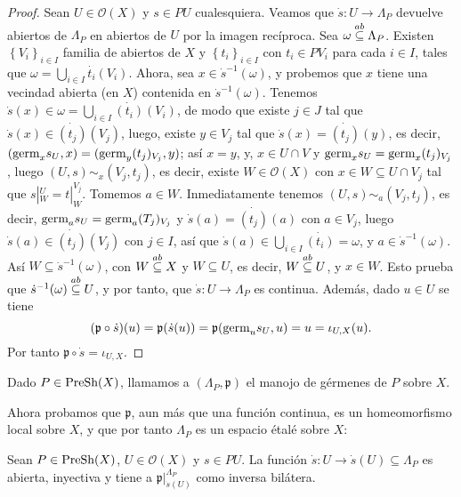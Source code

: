 \begin{proof}
   Sean $U\in\mathcal{O}(X)$ y $s\in PU$ cualesquiera. Veamos que $\dot{s}:U\to\Lambda_P$ devuelve abiertos de $\Lambda_P$ en abiertos de $U$ por la imagen recíproca. Sea $\omega\stackrel{ab}{\subseteq} \Lambda_P$. Existen $\left\lbrace V_i\right\rbrace_{i\in I}$ familia de abiertos de $X$ y $\left\lbrace t_i\right\rbrace_{i\in I}$ con $t_i\in PV_i$ para cada $i\in I$, tales que $\omega=\bigcup_{i\in I}\dot{t_i}(V_i)$. Ahora, sea $x\in\dot{s}^{-1}(\omega)$, y probemos que $x$ tiene una vecindad abierta (en $X$) contenida en $\dot{s}^{-1}(\omega)$. Tenemos $\dot{s}(x)\in\omega=\bigcup_{i\in I}\dot{(t_i)}(V_i)$, de modo que existe $j\in J$ tal que $\dot{s}(x)\in\dot{(t_{j})}(V_j)$, luego, existe $y\in V_j$ tal que $\dot{s}(x)=\dot{(t_j)}(y)$, es decir, $(\normalfont{\text{germ}}_{x}s_U,x)=(\normalfont{\text{germ}}_{y}(t_j)_{V_j},y)$; así $x=y$, y, $x\in U\cap V$ y $\normalfont{\text{germ}}_{x}s_{U}=\normalfont{\text{germ}}_{x}(t_j)_{V_j}$, luego $(U,s)\sim_{x}(V_j,t_j)$, es decir, existe $W\in\mathcal{O}(X)$ con $x\in W\subseteq U\cap V_j$ tal que $s|^{U}_{W}=t|^{V_j}_{W}$. Tomemos $a\in W$. Inmediatamente tenemos $(U,s)\sim_{a}(V_j,t_j)$, es decir, $\normalfont{\text{germ}}_{a}s_{U}=\normalfont{\text{germ}}_{a}(T_j)_{V_j}$ y $\dot{s}(a)=\dot{(t_j)}(a)$ con $a\in V_j$, luego $\dot{s}(a)\in\dot{(t_j)}(V_j)$ con $j\in I$, así que $\dot{s}(a)\in\bigcup_{i\in I}\dot{(t_i)}=\omega$, y $a\in\dot{s}^{-1}(\omega)$. Así $W\subseteq\dot{s}^{-1}(\omega)$, con $W\stackrel{ab}{\subseteq} X$ y $W\subseteq U$, es decir, $W\stackrel{ab}{\subseteq} U$, y $x\in W$. Esto prueba que $\dot{s}^{-1}(\omega)\stackrel{ab}{\subseteq} U$, y por tanto, que $\dot{s}:U\to\Lambda_P$ es continua. Además, dado $u\in U$ se tiene
   $$
      (\mathfrak{p}\circ\dot{s})(u)=\mathfrak{p}(\dot{s}(u))=\mathfrak{p}(\normalfont{\text{germ}}_{u}s_{U},u)=u=\iota_{U,X}(u).
   $$
   Por tanto $\mathfrak{p}\circ \dot{s}=\iota_{U,X}$.
\end{proof}
\begin{Def}
   Dado $P\in \normalfont{\text{PreSh}}(X)$, llamamos a $(\Lambda_P,\mathfrak{p})$ el manojo de gérmenes de $P$ sobre $X$.
\end{Def}
Ahora probamos que $\mathfrak{p}$, aun más que una función continua, es un homeomorfismo local sobre $X$, y que por tanto $\Lambda_P$ es un espacio étalé sobre $X$:
\begin{Lema}
   Sean $P\in\normalfont{\text{PreSh}}(X)$, $U\in \mathcal{O}(X)$ y $s\in PU$. La función $\dot{s}:U\to \dot{s}(U)\subseteq\Lambda_P$ es abierta, inyectiva y tiene a $\mathfrak{p}|^{\Lambda_P}_{\dot{s}(U)}$ como inversa bilátera. 
\end{Lema}

